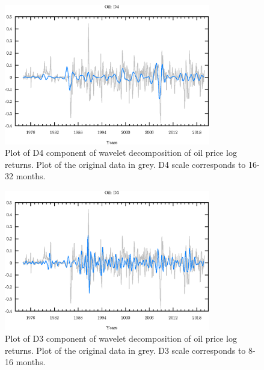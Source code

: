 \begin{figure}
\begin{center}
\includegraphics[width=0.8\textwidth]{./code/plot/oil_wr_D4.eps}
\caption{Plot of D4 component of wavelet decomposition of oil price log returns. 
	Plot of the original data in grey. D4 scale corresponds to 16-32 months.}
\label{fig:oil_wr_d4}
\end{center}
\end{figure}

\begin{figure}
\begin{center}
\includegraphics[width=0.8\textwidth]{./code/plot/oil_wr_D3.eps}
\caption{Plot of D3 component of wavelet decomposition of oil price log returns. 
	Plot of the original data in grey. D3 scale corresponds to 8-16 months.}
\label{fig:oil-wr-d3}
\end{center}
\end{figure}

